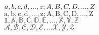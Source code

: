 \documentclass[11pt]{article}
\begin{document}

$\mathnormal{a,b,c,d,...,z;A,B,C,D,...,Z}$ \\
$\mathrm{a,b,c,d,...,z;A,B,C,D,...,Z}$ \\
$\mathbb{1,A,B,C,D,E,...,X,Y,Z}$ \\
$\mathcal{A,B,C,D,E,...X,Y,Z}$ \\
\end{document}
